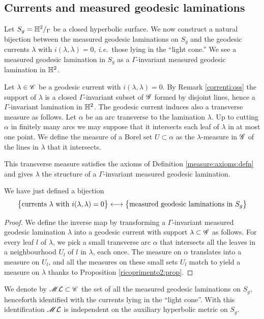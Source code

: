 \subsection{Currents and measured geodesic laminations}
Let $S_g=\mathbb{H}^2/_\Gamma$ be a closed hyperbolic surface. We now construct a natural bijection between the measured geodesic laminations on $S_g$ and the geodesic currents $\lambda$ with $i(\lambda,\lambda)=0$, \emph{i.e.}~those lying in the ``light cone.'' We see a measured geodesic lamination in $S_g$ as a $\Gamma$-invariant measured geodesic lamination in $\mathbb{H}^2$.

Let $\lambda \in \mathscr{C}$ be a geodesic current with $i(\lambda,\lambda)=0$. By Remark \ref{correnti:oss} the support of $\lambda$ is a closed $\Gamma$-invariant subset of $\mathscr{G}$ formed by disjoint lines, hence a $\Gamma$-invariant lamination in $\mathbb{H}^2$. The geodesic current induces also a transverse measure as follows. Let $\alpha$ be an arc transverse to the lamination $\lambda$. Up to cutting $\alpha$ in finitely many arcs we may suppose that it intersects each leaf of $\lambda$ in at most one point. We define the measure of a Borel set $U\subset \alpha$ as the $\lambda$-measure in $\mathscr{G}$ of the lines in $\lambda$ that it intersects.
\begin{ex}
This transverse measure satisfies the axioms of Definition \ref{measure:axioms:defn} and gives $\lambda$ the structure of a $\Gamma$-invariant measured geodesic lamination.
\end{ex}
\begin{prop}
We have just defined a bijection
$$\big\{ {\rm currents\ } \lambda {\rm \ with\ } i(\lambda,\lambda)=0 \big\}
\longleftrightarrow 
\big\{ {\rm measured\ geodesic\ laminations\ in\ } S_g\big\}
$$
\end{prop}
\begin{proof}
We define the inverse map by transforming a $\Gamma$-invariant measured geodesic lamination $\lambda$ into a geodesic current with support $\lambda \subset \mathscr{G}$ as follows. For every leaf $l$ of $\lambda$, we pick a small transverse arc $\alpha$ that intersects all the leaves in a neighbourhood $U_l$ of $l$ in $\lambda$, each once. The measure on $\alpha$ translates into a measure on $U_l$, and all the measures on these small sets $U_l$ match to yield a measure on $\lambda$ thanks to Proposition  \ref{ricoprimento2:prop}. 
\end{proof}

We denote by $\mathscr{M}\mathcal{L}\subset \mathscr{C}$ the set of all the measured geodesic laminations on $S_g$, henceforth identified with the currents lying in the ``light cone''. With this identification $\calML$ is independent on the auxiliary hyperbolic metric on $S_g$.\index{$\calML$}

